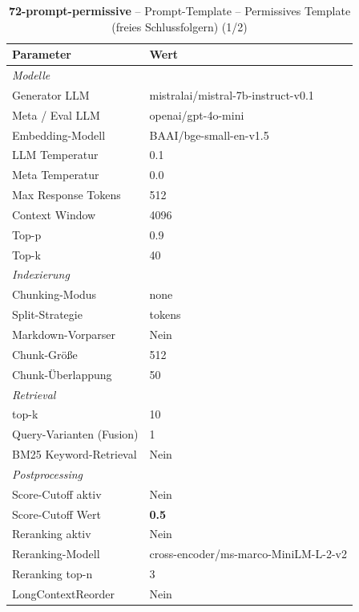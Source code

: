 \begin{table}[H]
\centering
\small
\setlength{\tabcolsep}{4pt}
\begin{tabular}{lp{8cm}}
\toprule
\textbf{Parameter} & \textbf{Wert} \\
\midrule
\multicolumn{2}{l}{\textit{Modelle}} \\
\midrule
\quad Generator LLM & mistralai/mistral-7b-instruct-v0.1 \\
\quad Meta / Eval LLM & openai/gpt-4o-mini \\
\quad Embedding-Modell & BAAI/bge-small-en-v1.5 \\
\quad LLM Temperatur & 0.1 \\
\quad Meta Temperatur & 0.0 \\
\quad Max Response Tokens & 512 \\
\quad Context Window & 4096 \\
\quad Top-p & 0.9 \\
\quad Top-k & 40 \\
\midrule
\multicolumn{2}{l}{\textit{Indexierung}} \\
\midrule
\quad Chunking-Modus & none \\
\quad Split-Strategie & tokens \\
\quad Markdown-Vorparser & Nein \\
\quad Chunk-Größe & 512 \\
\quad Chunk-Überlappung & 50 \\
\midrule
\multicolumn{2}{l}{\textit{Retrieval}} \\
\midrule
\quad top-k & 10 \\
\quad Query-Varianten (Fusion) & 1 \\
\quad BM25 Keyword-Retrieval & Nein \\
\midrule
\multicolumn{2}{l}{\textit{Postprocessing}} \\
\midrule
\quad Score-Cutoff aktiv & Nein \\
\quad Score-Cutoff Wert & \textbf{0.5} \\
\quad Reranking aktiv & Nein \\
\quad Reranking-Modell & cross-encoder/ms-marco-MiniLM-L-2-v2 \\
\quad Reranking top-n & 3 \\
\quad LongContextReorder & Nein \\
\bottomrule
\end{tabular}
\caption{\textbf{72-prompt-permissive} -- Prompt-Template -- Permissives Template (freies Schlussfolgern) (1/2)}
\label{tab:config_72_prompt_permissive_a}
\end{table}

